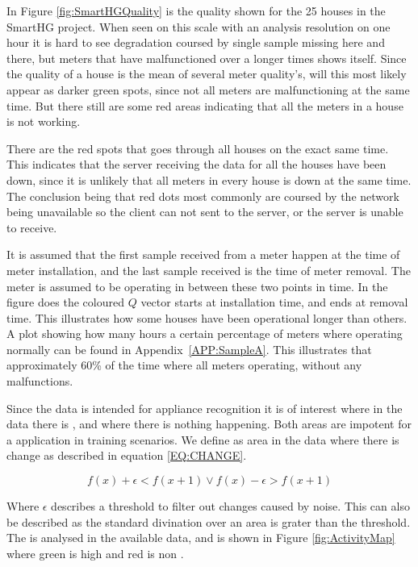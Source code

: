 In Figure \ref{fig:SmartHGQuality} is the  quality shown for the 25 houses in the SmartHG project. When seen on this scale with an analysis resolution on one hour it is hard to see degradation coursed by single sample missing here and there, but meters that have malfunctioned over a longer times shows itself. Since the quality of a house is the mean of several meter quality's, will this most likely appear as darker green spots, since not all meters are malfunctioning at the same time. But there still are some red areas indicating that all the meters in a house is not working. 

There are the red spots that goes through all houses on the exact same time. This indicates that the server receiving the data for all the houses have been down, since it is unlikely that all meters in every house is down at the same time. The conclusion being that red dots most commonly are coursed by the network being unavailable so the client can not sent to the server, or the server is unable to receive. 

It is assumed that the first sample received from a meter happen at the time of meter installation, and the last sample received is the time of meter removal. The meter is assumed to be operating in between these two points in time. In the figure does the coloured $Q$ vector starts at installation time, and ends at removal time. This illustrates how some houses have been operational longer than others. A plot showing how many hours a certain percentage of meters where operating normally can be found in Appendix~\ref{APP:SampleA}. This illustrates that approximately 60\% of the time where all meters operating, without any malfunctions.

Since the data is intended for appliance recognition it is of interest where in the data there is , and where there is nothing happening. Both areas are impotent for a  application in training scenarios. We define  as area in the data where there is change as described in equation \ref{EQ:CHANGE}.

\begin{equation}
f(x) + \epsilon < f(x+1) \vee f(x) - \epsilon > f(x+1)
\label{EQ:CHANGE}
\end{equation}

Where $\epsilon$ describes a threshold to filter out changes caused by noise. This can also be described as the standard divination over an area is grater than the threshold. The  is analysed in the available data, and is shown in Figure \ref{fig:ActivityMap} where green is high  and red is non . 

